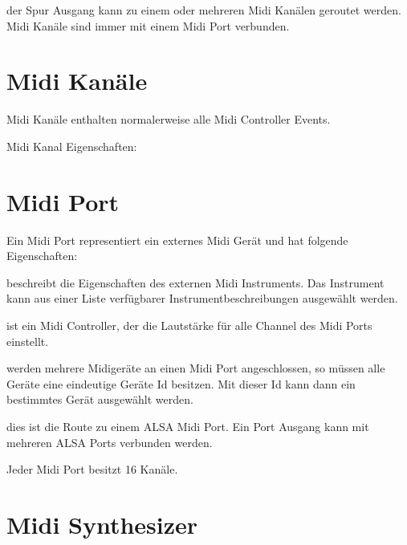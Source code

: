        der Spur Ausgang kann zu einem oder mehreren
            Midi Kanälen geroutet werden. Midi Kanäle sind immer mit
            einem Midi Port verbunden.

      \blank[big]

  \section{Midi Kanäle}
      Midi Kanäle enthalten normalerweise alle Midi Controller Events.

      Midi Kanal Eigenschaften:

      \blank[big]

      \blank[big]

  \section{Midi Port}

       Ein Midi Port representiert ein externes Midi 
      Gerät und hat folgende Eigenschaften:

      \blank[big]
        beschreibt die 
        Eigenschaften des externen
        Midi Instruments. Das Instrument kann aus einer Liste verfügbarer
        Instrumentbeschreibungen ausgewählt werden.

        ist ein Midi 
      Controller, der die Lautstärke für alle Channel des Midi Ports 
      einstellt.

        werden mehrere Midigeräte 
      an einen Midi Port
      angeschlossen, so müssen alle Geräte eine eindeutige Geräte Id
      besitzen. Mit dieser Id kann dann ein bestimmtes Gerät
      ausgewählt werden.

       dies ist die Route zu einem ALSA Midi Port.
      Ein Port Ausgang kann mit mehreren ALSA Ports verbunden werden.

      \blank[big]

      Jeder Midi Port besitzt 16 Kanäle.

  \section{Midi Synthesizer}

